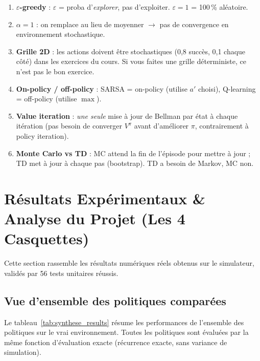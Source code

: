 \documentclass[11pt,a4paper]{article}
\begin{document}
\begin{warnbox}
\begin{enumerate}[nosep]
  \item \textbf{$\varepsilon$-greedy} : $\varepsilon$ = proba d'\textit{explorer}, pas d'exploiter. $\varepsilon = 1$ = 100\,\% aléatoire.
  \item \textbf{$\alpha = 1$} : on remplace au lieu de moyenner $\to$ pas de convergence en environnement stochastique.
  \item \textbf{Grille 2D} : les actions doivent être stochastiques (0{,}8 succès, 0{,}1 chaque côté) dans les exercices du cours. Si vous faites une grille déterministe, ce n'est pas le bon exercice.
  \item \textbf{On-policy / off-policy} : SARSA = on-policy (utilise $a'$ choisi), Q-learning = off-policy (utilise $\max$).
  \item \textbf{Value iteration} : \textit{une seule} mise à jour de Bellman par état à chaque itération (pas besoin de converger $V^\pi$ avant d'améliorer $\pi$, contrairement à policy iteration).
  \item \textbf{Monte Carlo vs TD} : MC attend la fin de l'épisode pour mettre à jour ; TD met à jour à chaque pas (bootstrap). TD a besoin de Markov, MC non.
\end{enumerate}
\end{warnbox}

\newpage
\section{Résultats Expérimentaux \& Analyse du Projet (Les 4 Casquettes)}

Cette section rassemble les résultats numériques réels obtenus sur le simulateur, validés par 56 tests unitaires réussis.

\subsection{Vue d'ensemble des politiques comparées}

Le tableau~\ref{tab:synthese_results} résume les performances de l'ensemble des politiques sur le vrai environnement. Toutes les politiques sont évaluées par la même fonction d'évaluation exacte (récurrence exacte, sans variance de simulation).
\end{document}
